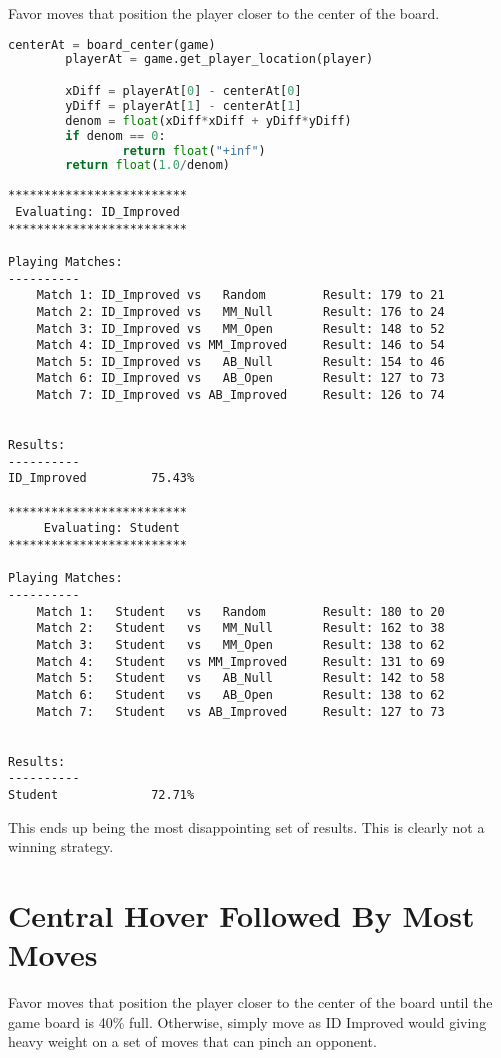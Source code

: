 \documentclass[10pt, a4paper]{article}
\begin{document}
Favor moves that position the player closer to the center of the board.

\begin{lstlisting}[language=Python]
		centerAt = board_center(game)
		playerAt = game.get_player_location(player)

		xDiff = playerAt[0] - centerAt[0]
		yDiff = playerAt[1] - centerAt[1]
		denom = float(xDiff*xDiff + yDiff*yDiff)
		if denom == 0:
				return float("+inf")
		return float(1.0/denom)
\end{lstlisting}

\begin{verbatim}
*************************
 Evaluating: ID_Improved 
*************************

Playing Matches:
----------
	Match 1: ID_Improved vs   Random    	Result: 179 to 21
	Match 2: ID_Improved vs   MM_Null   	Result: 176 to 24
	Match 3: ID_Improved vs   MM_Open   	Result: 148 to 52
	Match 4: ID_Improved vs MM_Improved 	Result: 146 to 54
	Match 5: ID_Improved vs   AB_Null   	Result: 154 to 46
	Match 6: ID_Improved vs   AB_Open   	Result: 127 to 73
	Match 7: ID_Improved vs AB_Improved 	Result: 126 to 74


Results:
----------
ID_Improved         75.43%

*************************
	 Evaluating: Student   
*************************

Playing Matches:
----------
	Match 1:   Student   vs   Random    	Result: 180 to 20
	Match 2:   Student   vs   MM_Null   	Result: 162 to 38
	Match 3:   Student   vs   MM_Open   	Result: 138 to 62
	Match 4:   Student   vs MM_Improved 	Result: 131 to 69
	Match 5:   Student   vs   AB_Null   	Result: 142 to 58
	Match 6:   Student   vs   AB_Open   	Result: 138 to 62
	Match 7:   Student   vs AB_Improved 	Result: 127 to 73


Results:
----------
Student             72.71%
\end{verbatim}

This ends up being the most disappointing set of results.  This is clearly not
a winning strategy.

\section{Central Hover Followed By Most Moves}

Favor moves that position the player closer to the center of the board until the game board is 40\% full.
Otherwise, simply move as ID Improved would giving heavy weight on a set of moves that can pinch an opponent.
\end{document}
